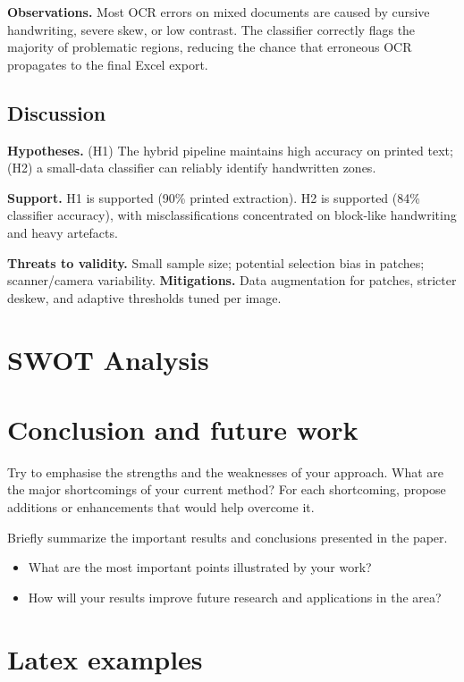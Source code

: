 \documentclass[runningheads,a4paper,11pt]{report}
\begin{document}
\noindent
\textbf{Observations.}
Most OCR errors on mixed documents are caused by cursive handwriting, severe skew, or low contrast.
The classifier correctly flags the majority of problematic regions, reducing the chance that erroneous OCR propagates to the final Excel export.

\section{Discussion}
\textbf{Hypotheses.} (H1) The hybrid pipeline maintains high accuracy on printed text; (H2) a small-data classifier can reliably identify handwritten zones.

\noindent
\textbf{Support.} H1 is supported (90\% printed extraction). H2 is supported (84\% classifier accuracy), with misclassifications concentrated on block-like handwriting and heavy artefacts.

\noindent
\textbf{Threats to validity.} Small sample size; potential selection bias in patches; scanner/camera variability.
\textbf{Mitigations.} Data augmentation for patches, stricter deskew, and adaptive thresholds tuned per image.



\chapter{SWOT Analysis}
\label{chapter:swot}


\chapter{Conclusion and future work}
\label{chapter:concl}

Try to emphasise the strengths and the weaknesses of your approach.
What are the major shortcomings of your current method? For each shortcoming, propose additions or enhancements that would help overcome it.

Briefly summarize the important results and conclusions presented in the paper.

\begin{itemize}
	\item What are the most important points illustrated by your work?
	\item How will your results improve future research and applications in the area?
\end{itemize}


\chapter{Latex examples}
\end{document}
